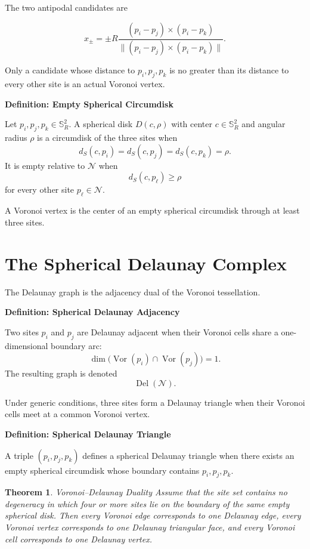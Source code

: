 \documentclass[11pt,fleqn]{book}
\numberwithin{equation}{chapter}
\newenvironment{definition}[1]
  {\begin{definitionEnv}
   \noindent\textbf{Definition: #1}\par\smallskip}
  {\end{definitionEnv}}
\theoremstyle{plain}
\newtheorem{theorem}{Theorem}[chapter]
\theoremstyle{definition}
\theoremstyle{remark}
\newcommand{\Sphere}{\mathbb{S}^{2}}
\newcommand{\Nset}{\mathcal{N}}
\newcommand{\Vor}{\operatorname{Vor}}
\newcommand{\Del}{\operatorname{Del}}
\begin{document}
The two antipodal candidates are

\begin{equation}
    x_{\pm}
    =
    \pm R
    \frac{
      (p_i-p_j)\times(p_i-p_k)
    }{
      \|
      (p_i-p_j)\times(p_i-p_k)
      \|
    }.
\end{equation}

Only a candidate whose distance to \(p_i,p_j,p_k\) is no greater than its distance to every other site is an actual Voronoi vertex.

\begin{definition}{Empty Spherical Circumdisk}
Let \(p_i,p_j,p_k\in\Sphere_R\). A spherical disk \(D(c,\rho)\) with center \(c\in\Sphere_R\) and angular radius \(\rho\) is a circumdisk of the three sites when
\[
d_S(c,p_i)
=
d_S(c,p_j)
=
d_S(c,p_k)
=
\rho.
\]
It is empty relative to \(\Nset\) when
\[
d_S(c,p_\ell)\geq \rho
\]
for every other site \(p_\ell\in\Nset\).
\end{definition}

A Voronoi vertex is the center of an empty spherical circumdisk through at least three sites.

\section{The Spherical Delaunay Complex}

The Delaunay graph is the adjacency dual of the Voronoi tessellation.

\begin{definition}{Spherical Delaunay Adjacency}
Two sites \(p_i\) and \(p_j\) are Delaunay adjacent when their Voronoi cells share a one-dimensional boundary arc:
\[
\dim\bigl(
\Vor(p_i)\cap\Vor(p_j)
\bigr)=1.
\]
The resulting graph is denoted
\[
\Del(\Nset).
\]
\end{definition}

Under generic conditions, three sites form a Delaunay triangle when their Voronoi cells meet at a common Voronoi vertex.

\begin{definition}{Spherical Delaunay Triangle}
A triple \((p_i,p_j,p_k)\) defines a spherical Delaunay triangle when there exists an empty spherical circumdisk whose boundary contains \(p_i,p_j,p_k\).
\end{definition}

\begin{theorem}{Voronoi--Delaunay Duality}
Assume that the site set contains no degeneracy in which four or more sites lie on the boundary of the same empty spherical disk. Then every Voronoi edge corresponds to one Delaunay edge, every Voronoi vertex corresponds to one Delaunay triangular face, and every Voronoi cell corresponds to one Delaunay vertex.
\end{theorem}
\end{document}
